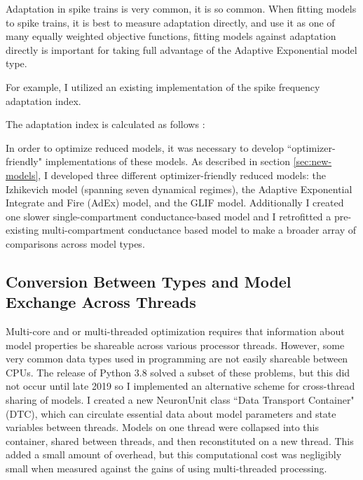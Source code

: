 Adaptation in spike trains is very common, it is so common. When fitting models to spike trains, it is best to measure adaptation directly, and use it as one of many equally weighted objective functions, fitting models against adaptation directly is important for taking full advantage of the Adaptive Exponential model type.

For example, I utilized an existing implementation of the spike frequency adaptation index.


The adaptation index is calculated as follows \citep{EFEL}:

  

In order to optimize reduced models, it was necessary to develop ``optimizer-friendly" implementations of these models.
As described in section \ref{sec:new-models}, I developed three different optimizer-friendly reduced models: the Izhikevich model (spanning seven dynamical regimes), the Adaptive Exponential Integrate and Fire (AdEx) model, and the GLIF model.
Additionally I created one slower single-compartment conductance-based model and I retrofitted a pre-existing multi-compartment conductance based model to make a broader array of comparisons across model types.

\subsection{Conversion Between Types and Model Exchange Across Threads}
Multi-core and or multi-threaded optimization requires that information about model properties be shareable across various processor threads.
However, some very common data types used in programming are not easily shareable between CPUs.
The release of Python 3.8 solved a subset of these problems, but this did not occur until late 2019 so I implemented an alternative scheme for cross-thread sharing of models.
I created a new NeuronUnit class ``Data Transport Container" (DTC), which can circulate essential data about model parameters and state variables between threads.
Models on one thread were collapsed into this container, shared between threads, and then reconstituted on a new thread.
This added a small amount of overhead, but this computational cost was negligibly small when measured against the gains of using multi-threaded processing.

